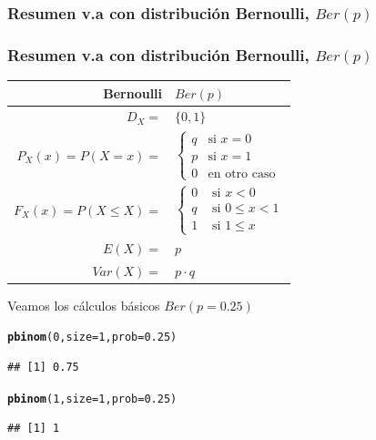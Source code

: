 \documentclass[handout]{beamer}\usepackage[]{graphicx}\usepackage[]{color}
\makeatletter
\newcommand{\hlnum}[1]{\textcolor[rgb]{0.686,0.059,0.569}{#1}}%
\newcommand{\hlstd}[1]{\textcolor[rgb]{0.345,0.345,0.345}{#1}}%
\newcommand{\hlkwc}[1]{\textcolor[rgb]{0.333,0.667,0.333}{#1}}%
\newcommand{\hlkwd}[1]{\textcolor[rgb]{0.737,0.353,0.396}{\textbf{#1}}}%
\newenvironment{kframe}{%
 \def\at@end@of@kframe{}%
 \ifinner\ifhmode%
  \def\at@end@of@kframe{\end{minipage}}%
  \begin{minipage}{\columnwidth}%
 \fi\fi%
 \def\FrameCommand##1{\hskip\@totalleftmargin \hskip-\fboxsep
 \colorbox{shadecolor}{##1}\hskip-\fboxsep
     \hskip-\linewidth \hskip-\@totalleftmargin \hskip\columnwidth}%
 \MakeFramed {\advance\hsize-\width
   \@totalleftmargin\z@ \linewidth\hsize
   \@setminipage}}%
 {\par\unskip\endMakeFramed%
 \at@end@of@kframe}
\newenvironment{knitrout}{}{} %
\renewcommand{\leq}{\leqslant}
\theoremstyle{plain}
\theoremstyle{definition}
\makeatother
\begin{document}
\subsubsection{Resumen v.a con distribución Bernoulli, $Ber(p)$}

\begin{frame}[fragile]
\frametitle{Resumen v.a con distribución Bernoulli, $Ber(p)$}
\begin{table}
\centering
\begin{tabular}{|rl|}
\hline 
\textbf{Bernoulli} & $Ber(p)$\\
\hline \hline 
$D_X=$ &  $\{0,1\}$ \\\hline 
$P_X(x)=P(X=x)=$ &  $\left\{\begin{array}{ll} q & \mbox{si } x=0\\
    p & \mbox{si } x=1\\
    0 & \mbox{en otro caso}\end{array}\right.$   \\ \hline 
$F_X(x)=P(X\leq X)=$ & $\left\{\begin{array}{ll} 0 & \mbox{ si } x<0\\
    q & \mbox{ si } 0\leq x<1\\
    1 & \mbox{ si } 1\leq x \end{array}\right.$ \\\hline 
$E(X)=$ &  $p$\\
$Var(X)=$ & $p\cdot q$\\
\hline
\end{tabular}
\end{table}
\end{frame}

\begin{frame}[fragile]

Veamos los cálculos básicos $Ber(p=0.25)$

\begin{knitrout}
\color{fgcolor}\begin{kframe}
\begin{alltt}
\hlkwd{pbinom}\hlstd{(}\hlnum{0}\hlstd{,}\hlkwc{size}\hlstd{=}\hlnum{1}\hlstd{,}\hlkwc{prob}\hlstd{=}\hlnum{0.25}\hlstd{)}
\end{alltt}
\begin{verbatim}
## [1] 0.75
\end{verbatim}
\begin{alltt}
\hlkwd{pbinom}\hlstd{(}\hlnum{1}\hlstd{,}\hlkwc{size}\hlstd{=}\hlnum{1}\hlstd{,}\hlkwc{prob}\hlstd{=}\hlnum{0.25}\hlstd{)}
\end{alltt}
\begin{verbatim}
## [1] 1
\end{verbatim}
\end{kframe}
\end{knitrout}

\end{frame}
\end{document}
